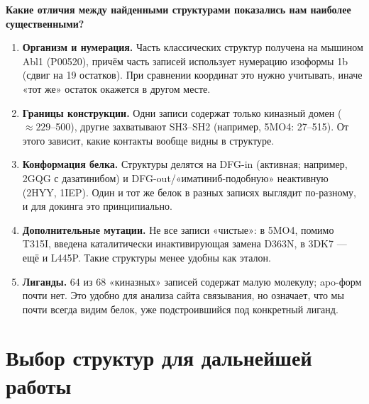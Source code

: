 \documentclass[12pt,a4paper]{article}
\newcommand{\code}[1]{{\ttfamily #1}}
\begin{document}
\medskip
\noindent\textbf{Какие отличия между найденными структурами показались нам наиболее
существенными?}
\begin{enumerate}[leftmargin=*,topsep=2pt,itemsep=2pt]
\item \textbf{Организм и нумерация.} Часть классических структур получена на мышином
Abl1 (\code{P00520}), причём часть записей использует нумерацию изоформы 1b (сдвиг на
19 остатков). При сравнении координат это нужно учитывать, иначе «тот же» остаток
окажется в другом месте.
\item \textbf{Границы конструкции.} Одни записи содержат только киназный домен
(${\approx}229$--500), другие захватывают SH3--SH2 (например, \code{5MO4}: 27--515).
От этого зависит, какие контакты вообще видны в структуре.
\item \textbf{Конформация белка.} Структуры делятся на DFG-in (активная; например,
\code{2GQG} с дазатинибом) и DFG-out/«иматиниб-подобную» неактивную (\code{2HYY},
\code{1IEP}). Один и тот же белок в разных записях выглядит по-разному, и для докинга
это принципиально.
\item \textbf{Дополнительные мутации.} Не все записи «чистые»: в \code{5MO4}, помимо
T315I, введена каталитически инактивирующая замена D363N, в \code{3DK7} --- ещё и L445P.
Такие структуры менее удобны как эталон.
\item \textbf{Лиганды.} 64 из 68 «киназных» записей содержат малую молекулу; apo-форм
почти нет. Это удобно для анализа сайта связывания, но означает, что мы почти всегда
видим белок, уже подстроившийся под конкретный лиганд.
\end{enumerate}

\section{Выбор структур для дальнейшей работы}
\end{document}
